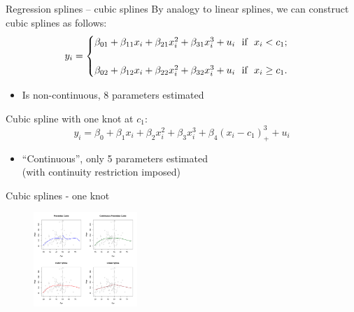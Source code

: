 \documentclass{beamer}
\begin{document}
\begin{frame}{Regression splines -- cubic splines}
By analogy to linear splines, we can construct cubic splines as follows:
\medskip
\begin{equation*}
y_i = 
    \begin{cases}
        \beta_{01} + \beta_{11} x_i + \beta_{21} x_i^2 + \beta_{31} x_i^3 + u_i \textnormal{~~if~~} x_i <  c_1 ;& \\ ~ & \\
         \beta_{02} + \beta_{12} x_i + \beta_{22} x_i^2 + \beta_{32} x_i^3 + u_i \textnormal{~~if~~} x_i \geq  c_1 .& 
    \end{cases}
\end{equation*}
\begin{itemize}
    \item Is non-continuous, 8 parameters estimated
\end{itemize}
\bigskip
Cubic spline with one knot at $c_1$:
$$
y_i = \beta_{0} + \beta_{1} x_i + \beta_{2} x_i^2 + \beta_{3} x_i^3 + \beta_{4} (x_i-c_1)_{+}^3 + u_i
$$
\vspace{-0.5cm}
\begin{itemize}
    \item ``Continuous'', only 5 parameters estimated \\(with continuity restriction imposed)
\end{itemize}
\end{frame}
\begin{frame}{Cubic splines - one knot}
\centering
\vspace{-0.2cm}
\begin{figure}
  \centering
  \includegraphics[trim=0cm 0cm 10.5cm 0cm, clip=true, width=0.35\textwidth]{IMG/ISLR73.pdf}
\end{figure}
\end{frame}
\end{document}

